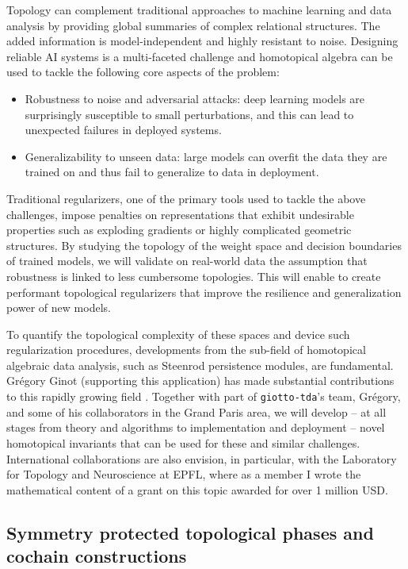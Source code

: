 Topology can complement traditional approaches to machine learning and data analysis by providing global summaries of complex relational structures.
The added information is model-independent and highly resistant to noise.
Designing reliable AI systems is a multi-faceted challenge and homotopical algebra can be used to tackle the following core aspects of the problem:

\begin{itemize}
	\item Robustness to noise and adversarial attacks: deep learning models are surprisingly susceptible to small perturbations, and this can lead to unexpected failures in deployed systems.
	\item Generalizability to unseen data: large models can overfit the data they are trained on and thus fail to generalize to data in deployment.
\end{itemize}
Traditional regularizers, one of the primary tools used to tackle the above challenges, impose penalties on representations that exhibit undesirable properties such as exploding gradients or highly complicated geometric structures.
By studying the topology of the weight space and decision boundaries of trained models, we will validate on real-world data the assumption that robustness is linked to less cumbersome topologies.
This will enable to create performant topological regularizers that improve the resilience and generalization power of new models.

To quantify the topological complexity of these spaces and device such regularization procedures, developments from the sub-field of homotopical algebraic data analysis, such as Steenrod persistence modules, are fundamental.
Gr\'egory Ginot (supporting this application) has made substantial contributions to this rapidly growing field \cite{ginot2021multiplicative}.
Together with part of \texttt{giotto-tda}'s team, Gr\'egory, and some of his collaborators in the Grand Paris area, we will develop -- at all stages from theory and algorithms to implementation and deployment -- novel homotopical invariants that can be used for these and similar challenges.
International collaborations are also envision, in particular, with the Laboratory for Topology and Neuroscience at EPFL, where as a member I wrote the mathematical content of a grant on this topic awarded for over 1 million USD.


\subsection{Symmetry protected topological phases and cochain constructions}

